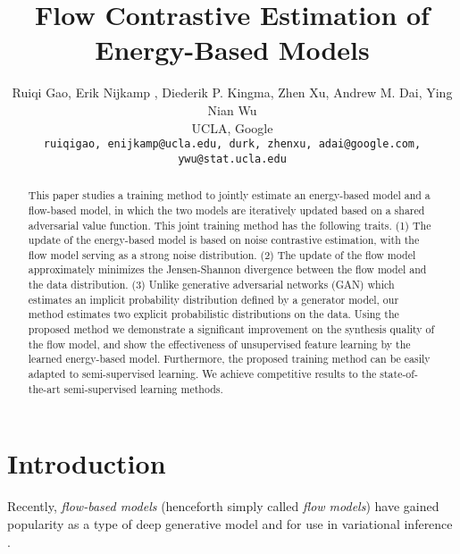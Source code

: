 \documentclass[10pt,twocolumn,letterpaper]{article}
\begin{document}
\title{Flow Contrastive Estimation of Energy-Based Models}

\author{Ruiqi Gao, Erik Nijkamp , Diederik P. Kingma, Zhen Xu, Andrew M. Dai, Ying Nian Wu\\
 UCLA,  Google \\ {\tt\small ruiqigao, enijkamp@ucla.edu, durk, zhenxu, adai@google.com, ywu@stat.ucla.edu}\\
}



\maketitle
\begin{abstract}
   This paper studies a training method to jointly estimate an energy-based model and a flow-based model, in which the two models are iteratively updated based on a shared adversarial value function. This joint training method has the following traits. (1) The update of the energy-based model is based on noise contrastive estimation, with the flow model serving as a strong noise distribution. (2) The update of the flow model approximately minimizes the Jensen-Shannon divergence between the flow model and the data distribution. (3) Unlike generative adversarial networks (GAN) which estimates an implicit probability distribution defined by a generator model, our method estimates two explicit probabilistic distributions on the data. Using the proposed method we demonstrate a significant improvement on the synthesis quality of the flow model, and show the effectiveness of unsupervised feature learning by the learned energy-based model. Furthermore, the proposed training method can be easily adapted to semi-supervised learning. We achieve competitive results to the state-of-the-art semi-supervised learning methods.
\end{abstract}

\section{Introduction}
Recently, \emph{flow-based models} (henceforth simply called \emph{flow models}) have gained popularity as a type of deep generative model \cite{dinh2014nice,dinh2016density, kingma2018Glow,grathwohl2018ffjord,behrmann2018invertible, kumar2019videoflow, tran2019discrete,durkan2019neural} and for use in variational inference \cite{kingma2013auto,rezende2015variational, kingma2016improved}. 
\end{document}
